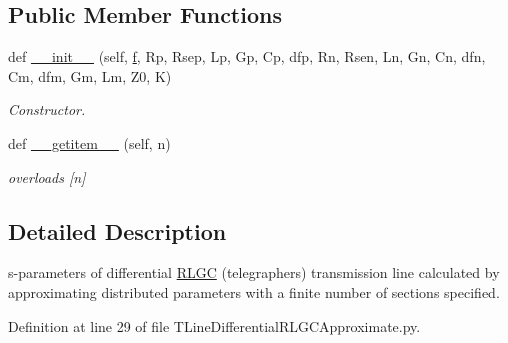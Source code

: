 \subsection*{Public Member Functions}
\begin{DoxyCompactItemize}
\item 
def \hyperlink{classSignalIntegrity_1_1SParameters_1_1Devices_1_1TLineDifferentialRLGCApproximate_1_1TLineDifferentialRLGCApproximate_a58e1768a4b29f316e37bd98032fbf748}{\+\_\+\+\_\+init\+\_\+\+\_\+} (self, \hyperlink{classSignalIntegrity_1_1SParameters_1_1SParameters_1_1SParameters_a32e7a34d6837fe949b413c852a0447f8}{f}, Rp, Rsep, Lp, Gp, Cp, dfp, Rn, Rsen, Ln, Gn, Cn, dfn, Cm, dfm, Gm, Lm, Z0, K)
\begin{DoxyCompactList}\small\item\em Constructor. \end{DoxyCompactList}\item 
def \hyperlink{classSignalIntegrity_1_1SParameters_1_1Devices_1_1TLineDifferentialRLGCApproximate_1_1TLineDifferentialRLGCApproximate_ab7a6da5139e0878b590d68292aaa70f2}{\+\_\+\+\_\+getitem\+\_\+\+\_\+} (self, n)
\begin{DoxyCompactList}\small\item\em overloads \mbox{[}n\mbox{]} \end{DoxyCompactList}\end{DoxyCompactItemize}


\subsection{Detailed Description}
s-\/parameters of differential \hyperlink{namespaceSignalIntegrity_1_1SParameters_1_1RLGC}{R\+L\+GC} (telegrapher\textquotesingle{}s) transmission line calculated by approximating distributed parameters with a finite number of sections specified. 



Definition at line 29 of file T\+Line\+Differential\+R\+L\+G\+C\+Approximate.\+py.



